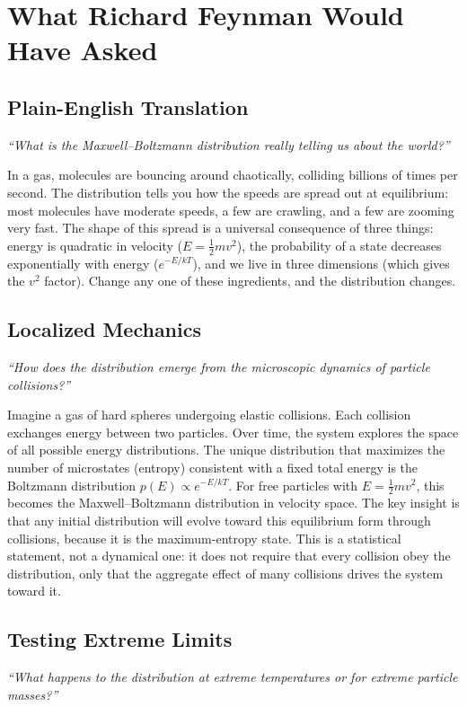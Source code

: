 \documentclass[11pt,openright]{book}
\begin{document}
\section*{What Richard Feynman Would Have Asked}

\subsection*{Plain-English Translation}
\textit{``What is the Maxwell--Boltzmann distribution really telling us about the world?''}

In a gas, molecules are bouncing around chaotically, colliding billions of times per second. The distribution tells you how the speeds are spread out at equilibrium: most molecules have moderate speeds, a few are crawling, and a few are zooming very fast. The shape of this spread is a universal consequence of three things: energy is quadratic in velocity ($E = \frac{1}{2}mv^{2}$), the probability of a state decreases exponentially with energy ($e^{-E/kT}$), and we live in three dimensions (which gives the $v^{2}$ factor). Change any one of these ingredients, and the distribution changes.

\subsection*{Localized Mechanics}
\textit{``How does the distribution emerge from the microscopic dynamics of particle collisions?''}

Imagine a gas of hard spheres undergoing elastic collisions. Each collision exchanges energy between two particles. Over time, the system explores the space of all possible energy distributions. The unique distribution that maximizes the number of microstates (entropy) consistent with a fixed total energy is the Boltzmann distribution $p(E) \propto e^{-E/kT}$. For free particles with $E = \frac{1}{2}mv^{2}$, this becomes the Maxwell--Boltzmann distribution in velocity space. The key insight is that any initial distribution will evolve toward this equilibrium form through collisions, because it is the maximum-entropy state. This is a statistical statement, not a dynamical one: it does not require that every collision obey the distribution, only that the aggregate effect of many collisions drives the system toward it.

\subsection*{Testing Extreme Limits}
\textit{``What happens to the distribution at extreme temperatures or for extreme particle masses?''}
\end{document}
